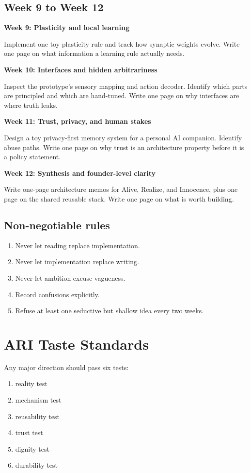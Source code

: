 \documentclass[11pt]{article}
\begin{document}
\subsection{Week 9 to Week 12}

\textbf{Week 9: Plasticity and local learning}

Implement one toy plasticity rule and track how synaptic weights evolve. Write one page on what information a learning rule actually needs.

\textbf{Week 10: Interfaces and hidden arbitrariness}

Inspect the prototype's sensory mapping and action decoder. Identify which parts are principled and which are hand-tuned. Write one page on why interfaces are where truth leaks.

\textbf{Week 11: Trust, privacy, and human stakes}

Design a toy privacy-first memory system for a personal AI companion. Identify abuse paths. Write one page on why trust is an architecture property before it is a policy statement.

\textbf{Week 12: Synthesis and founder-level clarity}

Write one-page architecture memos for Alive, Realize, and Innocence, plus one page on the shared reusable stack. Write one page on what is worth building.

\subsection{Non-negotiable rules}

\begin{enumerate}
  \item Never let reading replace implementation.
  \item Never let implementation replace writing.
  \item Never let ambition excuse vagueness.
  \item Record confusions explicitly.
  \item Refuse at least one seductive but shallow idea every two weeks.
\end{enumerate}

\section{ARI Taste Standards}

Any major direction should pass six tests:

\begin{enumerate}
  \item reality test
  \item mechanism test
  \item reusability test
  \item trust test
  \item dignity test
  \item durability test
\end{enumerate}
\end{document}
